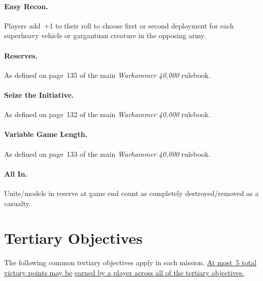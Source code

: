 \vspace{-2pt}
\paragraph{Easy Recon.}  Players add~+1 to their roll to
choose first or second deployment for each superheavy vehicle or
gargantuan creature in the opposing army.

\vspace{-2pt}
\paragraph{Reserves.} As defined on page~135 of the main
\emph{Warhammer 40,000} rulebook.

\vspace{-2pt}
\paragraph{Seize the Initiative.} As defined on page~132 of
the main \emph{Warhammer 40,000} rulebook.

\vspace{-2pt}
\paragraph{Variable Game Length.} As defined on page~133 of
the main \emph{Warhammer 40,000} rulebook.

\vspace{-2pt}
\paragraph{All In.}  Units/models in reserve at game end count
as completely destroyed/removed as a casualty.

\section{Tertiary Objectives}

The following common tertiary objectives apply in each mission.
\underline{At most~5 total victory points may be}
\underline{earned by a player across all of the tertiary objectives.}

